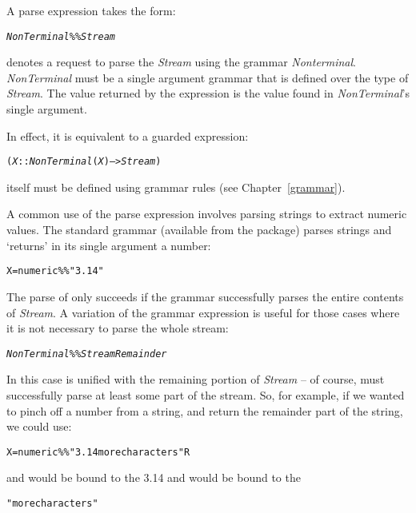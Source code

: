 A parse expression takes the form:
\begin{alltt}
\emph{NonTerminal} \%\% \emph{Stream}
\end{alltt}
denotes a request to parse the \emph{Stream} using the grammar \emph{Nonterminal}. \emph{NonTerminal} must be a single argument grammar that is defined over the type of \emph{Stream}. The value returned by the \q{\%\%} expression is the value found in \emph{NonTerminal}'s single argument.

In effect, it is equivalent to a guarded expression:
\begin{alltt}
(\emph{X} :: \emph{NonTerminal}(\emph{X}) --> \emph{Stream})
\end{alltt}
 itself must be defined using grammar rules (see Chapter~\vref{grammar}).

A common use of the parse expression involves parsing strings to extract numeric values. The standard  grammar (available from the  package) parses strings and `returns' in its single argument a number:
\begin{alltt}
X = numeric\%\%"3.14"
\end{alltt}

The parse of  only succeeds if the  grammar successfully parses the entire contents of \emph{Stream}. A variation of the grammar expression is useful for those cases where it is not necessary to parse the whole stream:
\begin{alltt}
\emph{NonTerminal} \%\% \emph{Stream}\tilda{}\emph{Remainder}
\end{alltt}
In this case  is unified with the remaining portion of \emph{Stream} -- of course,  must successfully parse at least some part of the stream. So, for example, if we wanted to pinch off a number from a string, and return the remainder part of the string, we could use:
\begin{alltt}
X=numeric\%\%"3.14 more characters"\tilda{}R
\end{alltt}
and  would be bound to the  3.14 and  would be bound to the 
\begin{alltt}
" more characters"
\end{alltt}

